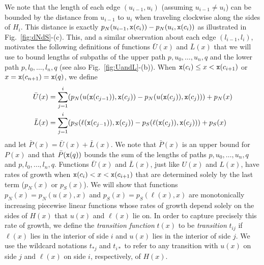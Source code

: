 We note that the length of each edge $(u_{i-1},u_i)$ 
(assuming $u_{i-1} \not= u_i$) can be bounded by the distance
from $u_{i-1}$ to $u_i$ when traveling clockwise along the sides of $H_i$.
This distance is exactly $p_N(u_{i-1}, {\tt x}(c_i)) - p_N(u_i,{\tt x}(c_i))$ as
illustrated in Fig.~\ref{fig:dNdS}-(c).
This, and a similar observation about each edge $(l_{i-1},l_i)$, motivates
the following definitions of functions $\bar{U}(x)$ and $\bar{L}(x)$ that we
will use to bound lengths of subpaths of the upper path $p,u_0, \dots,u_n,q$ 
and the lower path $p, l_0, \dots, l_n,q$ (see also Fig.~\ref{fig:UandL}-(b)). 
When ${\tt x}(c_i) \leq x < {\tt x}(c_{i+1})$ or $x = {\tt x}(c_{n+1}) = {\tt x}(q)$, we define
\begin{align*} 
\bar{U}(x) & = \sum_{j=1}^{i} (p_N(u({\tt x}(c_{j-1})), {\tt x}(c_{j})) - p_N(u({\tt x}(c_{j})),{\tt x}(c_{j}))) + p_N(x) \\
\bar{L}(x) & = \sum_{j=1}^{i} (p_S(\ell({\tt x}(c_{j-1})), {\tt x}(c_{j})) - p_S(\ell({\tt x}(c_{j})),{\tt x}(c_{j}))) + p_S(x)
\end{align*}
and let ${\bar P}(x)={\bar U}(x) + {\bar L}(x)$. We note that
${\bar P}(x)$ is an upper bound for $P(x)$ and that ${\bar P}({\tt x}(q))$
bounds the sum of the lengths of paths $p,u_0, \dots,u_n,q$ 
and $p, l_0, \dots, l_n,q$. Functions ${\bar U}(x)$ and ${\bar L}(x)$, 
just like $U(x)$ and $L(x)$, have rates of growth when
${\tt x}(c_i) < x < {\tt x}(c_{i+1})$ that are determined solely by the
last term ($p_N(x)$ or $p_S(x)$). We will show that functions 
$p_N(x)=p_N(u(x),x)$ and $p_S(x) = p_S(\ell(x),x)$ are monotonically
increasing piecewise linear functions whose rates of growth depend solely
on the sides of $H(x)$ that $u(x)$ and $\ell(x)$ lie on. In order to capture
precisely this rate of growth, we define the {\em transition
function} $t(x)$ to be {\em transition} $t_{ij}$ if $\ell(x)$ lies in the interior
of side $i$ and $u(x)$ lies in the interior of side $j$. We use the wildcard
notations $t_{\ast j}$ and $t_{i \ast}$ to refer to any
transition with $u(x)$ on side $j$ and $\ell(x)$ on side $i$, respectively,
of $H(x)$. 


